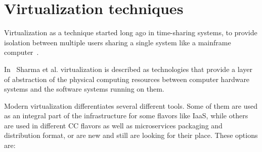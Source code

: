 \section{Virtualization techniques}\label{sec:virtualization_techniques}
%
Virtualization as a technique started long ago in time-sharing systems, to provide isolation between multiple users sharing a single system like a mainframe computer~\cite{CrosbyB06}. 

In~\cite{Sharma} Sharma et al. virtualization is described as technologies that provide a layer of abstraction of the physical computing resources between computer hardware systems and the software systems running on them.

Modern virtualization differentiates several different tools. Some of them are used as an integral part of the infrastructure for some flavors like IaaS, while others are used in different CC flavors as well as microservices packaging and distribution format, or are new and still are looking for their place. These options are:


